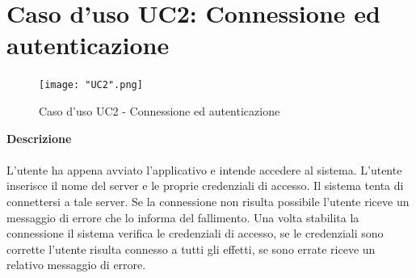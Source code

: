 \documentclass[a4paper]{report}
\begin{document}
	\section{Caso d'uso UC2: Connessione ed autenticazione}
		 	\begin{figure}[H]
				\centering
				\texttt{[image: "UC2".png]}
				\caption{Caso d'uso UC2 - Connessione ed autenticazione}
			\end{figure}
		 \textbf{Descrizione} \\ \\
		 L'utente ha appena avviato l'applicativo e intende accedere al sistema. L'utente 
		 inserisce il nome del server e le proprie credenziali di accesso. Il sistema tenta di connettersi a tale
		 server. Se la connessione non risulta possibile l'utente riceve un messaggio di errore che lo informa
		 del fallimento.
		 Una volta stabilita la connessione il sistema verifica le credenziali di accesso, se le credenziali sono
		 corrette l'utente risulta connesso a tutti gli effetti, se sono errate riceve un relativo messaggio di 
		 errore.
\end{document}
